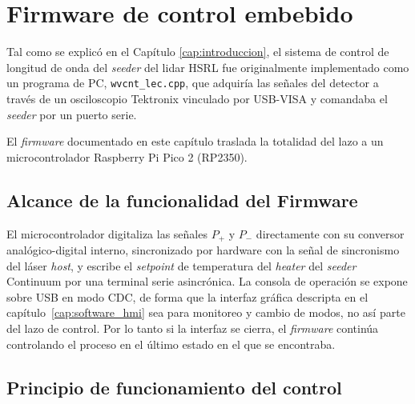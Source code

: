 
\chapter{Firmware de control embebido}
\label{cap:firmware}

Tal como se explicó en el Capítulo \ref{cap:introduccion}, el sistema de control de longitud de onda del \emph{seeder} del lidar HSRL fue originalmente implementado como un programa de PC, \texttt{wvcnt\_lec.cpp}, que adquiría las señales del detector a través de un osciloscopio Tektronix vinculado por USB-VISA y comandaba el \emph{seeder} por un puerto serie.

El \emph{firmware} documentado en este capítulo traslada la totalidad del lazo a un microcontrolador Raspberry Pi Pico 2 (RP2350). 

\section{Alcance de la funcionalidad del Firmware}
\label{sec:fw-alcance}

El microcontrolador digitaliza las señales $P_+$ y $P_-$ directamente con su conversor analógico-digital interno, sincronizado por hardware con la señal de sincronismo del láser \emph{host}, y escribe el \textit{setpoint} de temperatura del \emph{heater} del \emph{seeder} Continuum por una terminal serie asincrónica. La consola de operación se expone sobre USB en modo CDC, de forma que la interfaz gráfica descripta en el capítulo~\ref{cap:software_hmi} sea para monitoreo y cambio de modos, no así parte del lazo de control. Por lo tanto si la interfaz se cierra, el \emph{firmware} continúa controlando el proceso en el último estado en el que se encontraba.

\section{Principio de funcionamiento del control}
\label{sec:fw-principio}

